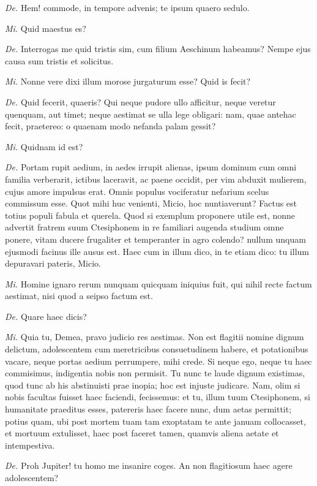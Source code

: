 {
\setlength{\parindent}{0pt}

\textit{De.} Hem! commode, in tempore advenis; te ipsum quaero sedulo. 

\textit{Mi.} Quid maestus es? 

\textit{De.} Interrogas me quid tristis sim, cum filium Aeschinum habeamus? Nempe ejus causa sum tristis et solicitus. 

\textit{Mi.} Nonne vere dixi illum morose jurgaturum esse? Quid is fecit? 

\textit{De.} Quid fecerit, quaeris? Qui neque pudore ullo afficitur, neque veretur quenquam, aut timet; neque aestimat se ulla lege obligari: nam, quae antehac fecit, praetereo: o quaenam modo nefanda palam gessit? 

\textit{Mi.} Quidnam id est? 

\textit{De.} Portam rupit aedium, in aedes irrupit alienas, ipsum dominum cum omni familia verberarit, ictibus laceravit, ac paene occidit, per vim abduxit mulierem, cujus amore impulsus erat. Omnis populus vociferatur nefarium scelus commissum esse. Quot mihi huc venienti, Micio, hoc nuntiaverunt? Factus est totius populi fabula et querela. Quod si exemplum proponere utile est, nonne advertit fratrem suum Ctesiphonem in re familiari augenda studium omne ponere, vitam ducere frugaliter et temperanter in agro colendo? nullum unquam ejusmodi facinus ille ausus est. Haec cum in illum dico, in te etiam dico: tu illum depuravari pateris, Micio. 

\textit{Mi.} Homine ignaro rerum nunquam quicquam iniquius fuit, qui nihil recte factum aestimat, nisi quod a seipso factum est.

\textit{De.} Quare haec dicis? 

\textit{Mi.} Quia tu, Demea, pravo judicio res aestimas. Non est flagitii nomine dignum delictum, adolescentem cum meretricibus consuetudinem habere, et potationibus vacare, neque portas aedium perrumpere, mihi crede. Si neque ego, neque tu haec commisimus, indigentia nobis non permisit. Tu nunc te laude dignum existimas, quod tunc ab his abstinuisti prae inopia; hoc est injuste judicare. Nam, olim si nobis facultas fuisset haec faciendi, fecissemus: et tu, illum tuum Ctesiphonem, si humanitate praeditus esses, patereris haec facere nunc, dum aetas permittit; potius quam, ubi post mortem tuam tam exoptatam te ante januam collocasset, et mortuum extulisset, haec post faceret tamen, quamvis aliena aetate et intempestiva. 

\textit{De.} Proh Jupiter! tu homo me insanire coges. An non flagitiosum haec agere adolescentem? 

}

